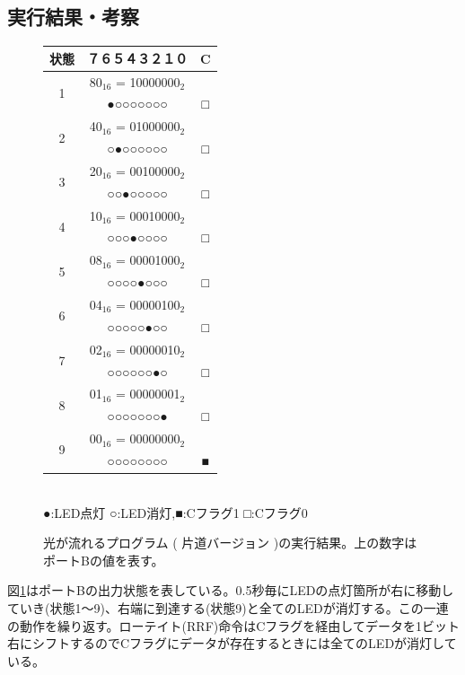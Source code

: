 \documentclass[a4paper,12pt]{ujarticle}
\begin{document}
  \subsection{実行結果・考察}
   \begin{figure}[htbp]
    \begin{center}
     \begin{tabular}{c|cc}\hline
      状態&７６５４３２１０ & C \\ \hline
      \multirow{2}{*}{1}&{80}$_{16}$ = 10000000$_2$ \\
      &●○○○○○○○ & □\\ \hline
      \multirow{2}{*}{2}&{40}$_{16}$ = 01000000$_2$ \\
      &○●○○○○○○ & □\\ \hline
      \multirow{2}{*}{3}&{20}$_{16}$ = 00100000$_2$ \\
      &○○●○○○○○ & □\\ \hline
      \multirow{2}{*}{4}&{10}$_{16}$ = 00010000$_2$ \\
      &○○○●○○○○ & □\\ \hline
      \multirow{2}{*}{5}&{08}$_{16}$  = 00001000$_2$ \\
      &○○○○●○○○ & □\\ \hline
      \multirow{2}{*}{6}&{04}$_{16}$  = 00000100$_2$ \\
      &○○○○○●○○ & □\\ \hline
      \multirow{2}{*}{7}&{02}$_{16}$  = 00000010$_2$ \\
      &○○○○○○●○ & □\\ \hline
      \multirow{2}{*}{8}&{01}$_{16}$  = 00000001$_2$ \\
      &○○○○○○○● & □\\ \hline
      \multirow{2}{*}{9}&{00}$_{16}$  = 00000000$_2$ \\
      &○○○○○○○○ & ■\\ \hline
     \end{tabular}\\
     ●:LED点灯 ○:LED消灯,■:Cフラグ1 □:Cフラグ0
    \end{center}
    \caption{光が流れるプログラム ( 片道バージョン )の実行結果。上の数字はポートBの値を表す。}
    \label{fig:out_5-5}
   \end{figure}
   図\ref{fig:out_5-5}はポートBの出力状態を表している。0.5秒毎にLEDの点灯箇所が右に移動していき(状態1〜9)、右端に到達する(状態9)と全てのLEDが消灯する。この一連の動作を繰り返す。ローテイト(RRF)命令はCフラグを経由してデータを1ビット右にシフトするのでCフラグにデータが存在するときには全てのLEDが消灯している。\\
\end{document}
